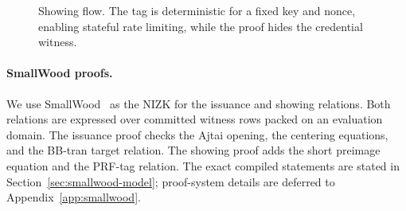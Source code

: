 \begin{figure}[h]
  \centering
  \caption{Showing flow.  The tag is deterministic for a fixed key and nonce, enabling stateful rate limiting, while the proof hides the credential witness.}
  \label{fig:showing-flow}
\end{figure}

\paragraph*{SmallWood proofs.}
We use SmallWood~\cite{EPRINT:FenRiv25b} as the NIZK for the issuance and showing relations.  Both
relations are expressed over committed witness rows packed on an evaluation domain.  The issuance proof
checks the Ajtai opening, the centering equations, and the BB-tran target relation.  The showing proof adds
the short preimage equation and the PRF-tag relation.  The exact compiled statements are stated in
Section~\ref{sec:smallwood-model}; proof-system details are deferred to Appendix~\ref{app:smallwood}.
